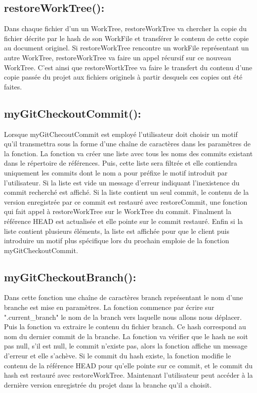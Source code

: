\documentclass[11pt,francais]{article}
\begin{document}
\subsection{restoreWorkTree():} 
	Dans chaque fichier d'un un WorkTree, restoreWorkTree va chercher la copie du fichier décrite par le hash de son WorkFile et transférer le contenu de cette copie au document originel. Si restoreWorkTree rencontre un workFile représentant un autre WorkTree, restoreWorkTree va faire un appel récursif sur ce nouveau WorkTree. C'est ainsi que restoreWortkTree va faire le transfert du contenu d'une copie passée du projet aux fichiers originels à partir desquels ces copies ont été faites. 
\subsection{myGitCheckoutCommit():}
	Lorsque myGitChecoutCommit est employé l'utilisateur doit choisir un motif qu'il transmettra sous la forme d'une chaîne de caractères dans les paramètres de la fonction. La fonction va créer une liste avec tous les noms des commits existant dans le répertoire de références. Puis, cette liste sera filtrée et elle contiendra uniquement les commits dont le nom a pour préfixe le motif introduit par l'utilisateur. Si la liste est vide un message d'erreur indiquant l'inexistence du commit recherché est affiché. Si la liste contient un seul commit, le contenu de la version enregistrée par ce commit est restauré avec restoreCommit, une fonction qui fait appel à restoreWorkTree sur le WorkTree du commit. Finalment la référence HEAD est actualisée et elle pointe sur le commit restauré. Enfin si la liste contient plusieurs éléments, la liste est affichée pour que le client puis introduire un motif plus spécifique lors du prochain emploie de la fonction  myGitCheckoutCommit.
\subsection{myGitCheckoutBranch():}
	Dans cette fonction une chaîne de caractères branch représentant le nom d'une branche est mise en paramètres. La fonction commence par écrire sur ".current\_branch" le nom de la branch vers laquelle nous allons nous déplacer. Puis la fonction va extraire le contenu du fichier branch. Ce hash correspond au nom du dernier commit de la branche. La fonction va vérifier que le hash ne soit pas null, s'il est null, le commit n'existe pas, alors la fonction affiche un message d'erreur et elle s'achève. Si le commit du hash existe, la fonction modifie le contenu de la référence HEAD pour qu'elle pointe sur ce commit, et le commit du hash est restauré avec restoreWorkTree. Maintenant l'utilisateur peut accéder à la dernière version enregistrée du projet dans la branche qu'il a choisit.
	
\end{document}
